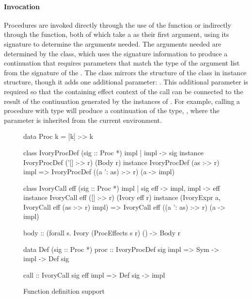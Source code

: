 \paragraph{Invocation} Procedures are invoked directly through the use of the
 function or indirectly through the  function, both of which
take a  as their first argument, using its signature to determine the
arguments needed.  The arguments needed are determined by the 
class, which uses the signature information to produce a continuation that
requires parameters that match the type of the argument list from the signature
of the .  The  class mirrors the structure of the
 class in instance structure, though it adds one additional
parameter: .  This additional parameter is required so that the
containing effect context of the call can be connected to the result of the
continuation generated by the instances of .  For example, calling
a procedure with type  will produce a
continuation of the type, , where the 
parameter is inherited from the current environment.


\begin{figure}[h]
\begin{code}
data Proc k = [k] :-> k

class IvoryProcDef (sig :: Proc *) impl | impl -> sig
instance IvoryProcDef ('[] :-> r) (Body r)
instance IvoryProcDef (as :-> r) impl
  => IvoryProcDef ((a ': as) :-> r) (a -> impl)

class IvoryCall eff (sig :: Proc *) impl
  | sig eff -> impl, impl -> eff
instance IvoryCall eff ([] :-> r) (Ivory eff r)
instance (IvoryExpr a, IvoryCall eff (as :-> r) impl)
  => IvoryCall eff ((a ': as) :-> r) (a -> impl)

body :: (forall s. Ivory (ProcEffects s r) () -> Body r

data Def (sig :: Proc *)
proc :: IvoryProcDef sig impl
     => Sym -> impl -> Def sig

call :: IvoryCall sig eff impl => Def sig -> impl
\end{code}
\caption{Function definition support}
\label{fig:proc-defs}
\end{figure}




